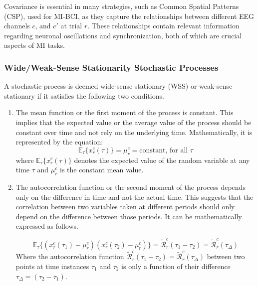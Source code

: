\documentclass[runningheads]{llncs}
\newenvironment{reviewer}{\setcounter{pointcounter}{1}}{}
\newcommand{\changes}[1]{\textcolor[rgb]{1.00,0.00,0.00}{#1}}
\begin{document}
\begin{reviewer}
{    \changes{
      Covariance is essential in many strategies, such as Common
      Spatial Patterns (CSP), used for MI-BCI, as they capture the
      relationships between different EEG channels $c$, and $c'$ at
    trial $r$.} These relationships contain relevant information
    regarding neuronal oscillations and synchronization, both of
    which are crucial aspects of MI tasks.

    \subsubsection{Wide/Weak-Sense Stationarity Stochastic Processes}

    A stochastic process is deemed wide-sense stationary (WSS) or
    weak-sense stationary if it satisfies the following two conditions.

    \begin{enumerate}
      \item The mean function or the first moment of the process is
        constant. This implies that the expected value or the average
        value of the process should be constant over time and not
        rely on the underlying time. Mathematically, it is
        represented by the equation:
        \changes{
          \begin{equation}
            \mathbb{E}_{\tau}\{x^{c}_{r}(\tau)\} = \mu^{c}_{r} =
            \text{constant, for all } \tau
          \end{equation}
          where $\mathbb{E}_{\tau}\{x^{c}_{r}(\tau)\}$ denotes the
          expected value of the random variable at any time $\tau$ and
        $\mu^{c}_{r}$ is the constant mean value.}

      \item The autocorrelation function or the second moment of the
        process depends only on the difference in time and not the
        actual time. This suggests that the correlation between two
        variables taken at different periods should only depend on
        the difference between those periods. It can be
        mathematically expressed as follows.

        \changes{
          \begin{equation}
            \mathbb{E}_{\tau}\{(x^{c}_{r}(\tau_1)-\mu^{c}_{r})(x^{c}_{r}(\tau_2)-\mu^{c}_{r})\}
            = \mathcal{\tilde{R}}^{c}_{r}(\tau_1 - \tau_2) =
            \mathcal{\tilde{R}}^{c}_{r}(\tau_{\Delta})
          \end{equation}
          Where the autocorrelation function
          $\mathcal{\tilde{R}}^{c}_{r}(\tau_1 - \tau_2) =
          \mathcal{\tilde{R}}^{c}_{r}(\tau_{\Delta})$ between two
          points at time instances $\tau_1$ and $\tau_2$ is only a
        function of their difference $\tau_{\Delta}=(\tau_2 - \tau_1)$.}
    \end{enumerate}

}
\end{reviewer}
\end{document}
